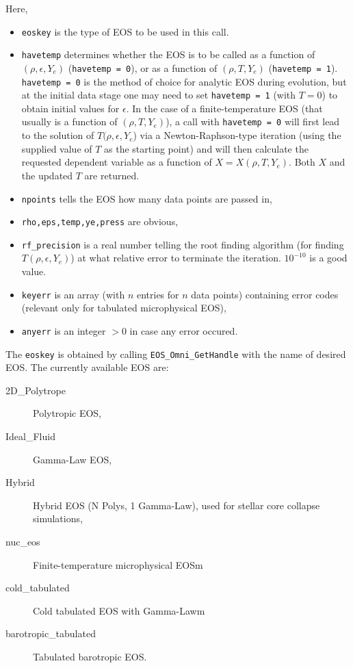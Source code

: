 Here, 
\begin{itemize}
\item \texttt{eoskey} is the type of EOS to be used in this call.
\item \texttt{havetemp} determines whether the EOS is to be called as
  a function of $(\rho,\epsilon,Y_e)$ (\texttt{havetemp = 0}), or as a
  function of $(\rho,T,Y_e)$ (\texttt{havetemp = 1}).
  \texttt{havetemp = 0} is the method of choice for analytic EOS during
  evolution, but at the initial data stage one may need to set
  \texttt{havetemp = 1} (with $T=0$) to obtain initial values for
  $\epsilon$.  In the case of a finite-temperature EOS (that usually
  is a function of $(\rho,T,Y_e)$), a call with \texttt{havetemp = 0}
  will first lead to the solution of $T(\rho,\epsilon,Y_e$) via a
  Newton-Raphson-type iteration (using the supplied value of $T$ as
  the starting point) and will then calculate the requested dependent
  variable as a function of $X=X(\rho,T,Y_e)$. Both $X$ and the updated
  $T$ are returned.

\item \texttt{npoints} tells the EOS how many data points are passed
  in,
\item \texttt{rho,eps,temp,ye,press} are obvious,
\item \texttt{rf\_precision} is a real number telling the root finding
  algorithm (for finding $T(\rho,\epsilon,Y_e)$) at what relative error
  to terminate the iteration. $10^{-10}$ is a good value.
\item \texttt{keyerr} is an array (with $n$ entries for $n$ data
  points) containing error codes (relevant only for tabulated
  microphysical EOS),
\item \texttt{anyerr} is an integer $>0$ in case
  any error occured.
\end{itemize}

The \texttt{eoskey} is obtained by calling \texttt{EOS\_Omni\_GetHandle} with
the name of desired EOS. The currently available EOS are:
\begin{description}
 \item[2D\_Polytrope] Polytropic EOS,
 \item[Ideal\_Fluid] Gamma-Law EOS,
 \item[Hybrid] Hybrid EOS (N Polys, 1 Gamma-Law), used for stellar core collapse simulations,
 \item[nuc\_eos] Finite-temperature microphysical EOSm
 \item[cold\_tabulated] Cold tabulated EOS with Gamma-Lawm
 \item[barotropic\_tabulated] Tabulated barotropic EOS.
\end{description}

